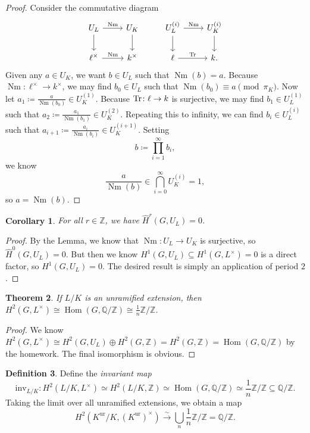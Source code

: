 \documentclass[leqno, openany]{memoir}
\newtheorem{thm}{Theorem}[section]
\newtheorem{cor}[thm]{Corollary}
\theoremstyle{definition}
\newtheorem{defn}[thm]{Definition}
\theoremstyle{remark}
\theoremstyle{plain}
\theoremstyle{definition}
\theoremstyle{remark}
\newcommand{\Z}{\mathbb{Z}}
\newcommand{\Q}{\mathbb{Q}}
\newcommand{\mr}[1]{\mathrm{#1}}
\newcommand{\wh}[1]{\widehat{#1}}
\DeclareMathOperator{\Hom}{Hom}
\DeclareMathOperator{\Nm}{Nm}
\begin{document}
\begin{proof}
    Consider the commutative diagram
    \begin{equation*}
    \begin{tikzcd}
        U_L \ar{r}{\Nm} \ar{d} & U_K \ar{d} & U_L^{(i)} \ar{r}{\Nm} \ar{d} & U_K^{(i)} \ar{d} \\
        \ell^{\times} \ar{r}{\Nm} & k^{\times} & \ell \ar{r}{\Tr} & k.
    \end{tikzcd}
    \end{equation*}
    Given any $a \in U_K$, we want $b \in U_L$ such that $\Nm(b) = a$. Because $\Nm \colon \ell^{\times} \to k^{\times}$, we may find $b_0 \in U_L$ such that $\Nm(b_0) \equiv a \pmod {\pi_K}$. Now let $a_1 \coloneqq \frac{a}{\Nm(b_0)} \in U_K^{(1)}$. Because $\Tr \colon \ell \to k$ is surjective, we may find $b_1 \in U_L^{(1)}$ such that $a_2 \coloneqq \frac{a_1}{\Nm(b_1)} \in U_K^{(2)}$. Repeating this to infinity, we can find $b_i \in U_L^{(i)}$ such that $a_{i+1} \coloneqq \frac{a_i}{\Nm(b_i)} \in U_K^{(i+1)}$. Setting 
    \[ b \coloneqq \prod_{i=1}^{\infty} b_i, \] 
    we know 
    \[ \frac{a}{\Nm(b)} \in \bigcap_{i=0}^{\infty}U_K^{(i)} = \qty{1}, \] 
    so $a = \Nm(b)$.
\end{proof}

\begin{cor}
    For all $r \in \Z$, we have $\wh{H}^r(G, U_L) = 0$.
\end{cor}

\begin{proof}
    By the Lemma, we know that $\Nm \colon U_L \to U_K$ is surjective, so $\wh{H}^0(G, U_L) = 0$. But then we know $H^1(G, U_L) \subseteq H^1(G, L^{\times}) = 0$ is a direct factor, so $H^1(G, U_L) = 0$. The desired result is simply an application of period $2$.
\end{proof}

\begin{thm}
    If $L/K$ is an unramified extension, then $H^2(G, L^{\times}) \cong \Hom(G, \Q/\Z) \cong \frac{1}{n} \Z / \Z$.
\end{thm}

\begin{proof}
    We know $H^2(G, L^{\times}) \cong H^2(G, U_L) \oplus H^2(G, \Z) = H^2(G, \Z) = \Hom(G, \Q/\Z)$ by the homework. The final isomorphism is obvious.
\end{proof}

\begin{defn}
    Define the \textit{invariant map} 
    \[ \mr{inv}_{L/K} \colon H^2(L /K, L^{\times}) \simeq H^2(L/K, \Z) \simeq \Hom(G, \Q/\Z) \simeq \frac{1}{n} \Z / \Z \subseteq \Q/\Z. \]
    Taking the limit over all unramified extensions, we obtain a map
    \[ H^2(K^{\mr{ur}}/K, {(K^{\mr{ur}})}^{\times}) \xrightarrow{\sim} \bigcup_n \frac{1}{n} \Z / \Z = \Q/\Z. \]
\end{defn}
\end{document}

